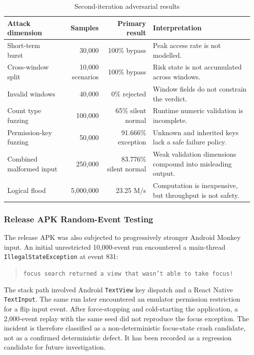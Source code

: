 \begin{table}[H]
\centering
\caption{Second-iteration adversarial results}
\label{tab:ch5-second-iteration}
\small
\begin{tabular}{p{3.0cm}rrp{5.8cm}}
\toprule
\textbf{Attack dimension} & \textbf{Samples} & \textbf{Primary result} & \textbf{Interpretation} \\
\midrule
Short-term burst & 30,000 & 100\% bypass & Peak access rate is not modelled. \\
Cross-window split & 10,000 scenarios & 100\% bypass & Risk state is not accumulated across windows. \\
Invalid windows & 40,000 & 0\% rejected & Window fields do not constrain the verdict. \\
Count type fuzzing & 100,000 & 65\% silent normal & Runtime numeric validation is incomplete. \\
Permission-key fuzzing & 50,000 & 91.666\% exception & Unknown and inherited keys lack a safe failure policy. \\
Combined malformed input & 250,000 & 83.776\% silent normal & Weak validation dimensions compound into misleading output. \\
Logical flood & 5,000,000 & 23.25 M/s & Computation is inexpensive, but throughput is not safety. \\
\bottomrule
\end{tabular}
\end{table}

\subsubsection{Release APK Random-Event Testing}

The release APK was also subjected to progressively stronger Android Monkey input. An initial unrestricted 10,000-event run encountered a main-thread
\texttt{IllegalStateException} at event 831:

\begin{quote}
\texttt{focus search returned a view that wasn't able to take focus!}
\end{quote}

The stack path involved Android \texttt{TextView} key dispatch and a React Native \texttt{TextInput}. The same run later encountered an emulator permission restriction for a flip input event. After force-stopping and cold-starting the application, a 2,000-event replay with the same seed did not reproduce the focus exception. The incident is therefore classified as a non-deterministic focus-state crash candidate, not as a confirmed deterministic defect. It has been recorded as a regression candidate for future investigation.

